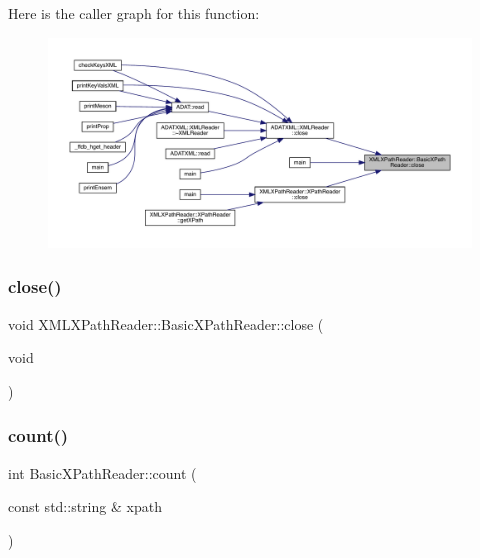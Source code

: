 Here is the caller graph for this function\+:\nopagebreak
\begin{figure}[H]
\begin{center}
\leavevmode
\includegraphics[width=350pt]{d6/dbf/classXMLXPathReader_1_1BasicXPathReader_acd03bd5e585de0a5077544314cd8fb9a_icgraph}
\end{center}
\end{figure}
\mbox{\label{classXMLXPathReader_1_1BasicXPathReader_acab41ee6353e8d7289d9c28828f9ceb6}} 
\subsubsection{\texorpdfstring{close()}{close()}\hspace{0.1cm}{\footnotesize\ttfamily [2/2]}}
{\footnotesize\ttfamily void X\+M\+L\+X\+Path\+Reader\+::\+Basic\+X\+Path\+Reader\+::close (\begin{DoxyParamCaption}\item[{void}]{ }\end{DoxyParamCaption})}

\mbox{\label{classXMLXPathReader_1_1BasicXPathReader_a2f1d474c6ff8160f210295f0d3671204}} 
\subsubsection{\texorpdfstring{count()}{count()}\hspace{0.1cm}{\footnotesize\ttfamily [1/2]}}
{\footnotesize\ttfamily int Basic\+X\+Path\+Reader\+::count (\begin{DoxyParamCaption}\item[{const std\+::string \&}]{xpath }\end{DoxyParamCaption})}

